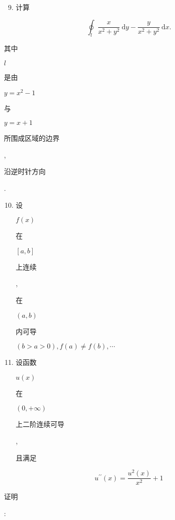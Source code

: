 \documentclass[10pt]{article}
\begin{document}
\begin{enumerate}
  \setcounter{enumi}{8}
  \item \begin{CJK}{UTF8}{mj}计算\end{CJK}
\end{enumerate}
$$
\oint_{l} \frac{x}{x^{2}+y^{2}} \mathrm{~d} y-\frac{y}{x^{2}+y^{2}} \mathrm{~d} x .
$$
\begin{CJK}{UTF8}{mj}其中\end{CJK} $l$ \begin{CJK}{UTF8}{mj}是由\end{CJK} $y=x^{2}-1$ \begin{CJK}{UTF8}{mj}与\end{CJK} $y=x+1$ \begin{CJK}{UTF8}{mj}所围成区域的边界\end{CJK}, \begin{CJK}{UTF8}{mj}沿逆时针方向\end{CJK}.

\begin{enumerate}
  \setcounter{enumi}{9}
  \item \begin{CJK}{UTF8}{mj}设\end{CJK} $f(x)$ \begin{CJK}{UTF8}{mj}在\end{CJK} $[a, b]$ \begin{CJK}{UTF8}{mj}上连续\end{CJK}, \begin{CJK}{UTF8}{mj}在\end{CJK} $(a, b)$ \begin{CJK}{UTF8}{mj}内可导\end{CJK} $(b>a>0), f(a) \neq f(b), \cdots$

  \item \begin{CJK}{UTF8}{mj}设函数\end{CJK} $u(x)$ \begin{CJK}{UTF8}{mj}在\end{CJK} $(0,+\infty)$ \begin{CJK}{UTF8}{mj}上二阶连续可导\end{CJK}, \begin{CJK}{UTF8}{mj}且满足\end{CJK}

\end{enumerate}
$$
u^{\prime \prime}(x)=\frac{u^{2}(x)}{x^{2}}+1
$$
\begin{CJK}{UTF8}{mj}证明\end{CJK}:
\end{document}
